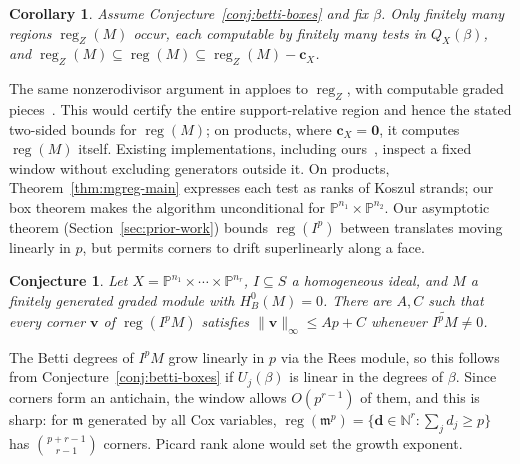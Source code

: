 \documentclass[11pt,reqno]{amsart}
\newtheorem{cor}[lemma]{Corollary}
\newtheorem{conjecture}[lemma]{Conjecture}
\theoremstyle{remark}
\newcommand{\reg}{\operatorname{reg}}
\newcommand{\dd}{\mathbf{d}}
\newcommand{\vv}{\mathbf{v}}
\newcommand{\zero}{\mathbf{0}}
\newcommand{\NN}{\mathbb{N}}
\newcommand{\PP}{\mathbb{P}}
\begin{document}
\begin{cor}\label{cor:finite-regularity-test}
Assume Conjecture~\ref{conj:betti-boxes} and fix $\beta$. Only finitely many regions $\reg_Z(M)$ occur, each computable by finitely many tests in $Q_X(\beta)$, and $\reg_Z(M)\subseteq\reg(M)\subseteq\reg_Z(M)-\mathbf c_X$. 
\end{cor}
 
The same nonzerodivisor argument in \cite[Corollary~4.8]{maclaganSmith04} apploes to $\reg_Z$, with computable graded pieces~\cite{EMS00}. This would certify the entire support-relative region and hence the stated two-sided bounds for $\reg(M)$; on products, where $\mathbf c_X=\zero$, it computes $\reg(M)$ itself. Existing implementations, including ours~\cite{ABLS20}, inspect a fixed window without excluding generators outside it. On products, Theorem~\ref{thm:mgreg-main} expresses each test as ranks of Koszul strands; our box theorem makes the algorithm unconditional for $\PP^{n_1}\times\PP^{n_2}$. Our asymptotic theorem (Section~\ref{sec:prior-work}) bounds $\reg(I^p)$ between translates moving linearly in $p$, but permits corners to drift superlinearly along a face.
 
\begin{conjecture}\label{conj:linear-windows-powers}
Let $X=\PP^{n_1}\times\cdots\times\PP^{n_r}$, $I\subseteq S$ a homogeneous ideal, and $M$ a finitely generated graded module with $H_B^0(M)=0$. There are $A,C$ such that every corner $\vv$ of $\reg(I^pM)$ satisfies $\|\vv\|_\infty\le Ap+C$ whenever $\widetilde{I^pM}\ne0$.
\end{conjecture}
 
The Betti degrees of $I^pM$ grow linearly in $p$ via the Rees module, so this follows from Conjecture~\ref{conj:betti-boxes} if $U_j(\beta)$ is linear in the degrees of $\beta$. Since corners form an antichain, the window allows $O(p^{r-1})$ of them, and this is sharp: for $\mathfrak m$ generated by all Cox variables, $\reg(\mathfrak m^p)=\{\dd\in\NN^r:\sum_jd_j\ge p\}$ has $\binom{p+r-1}{r-1}$ corners. Picard rank alone would set the growth exponent.
 
\end{document}
